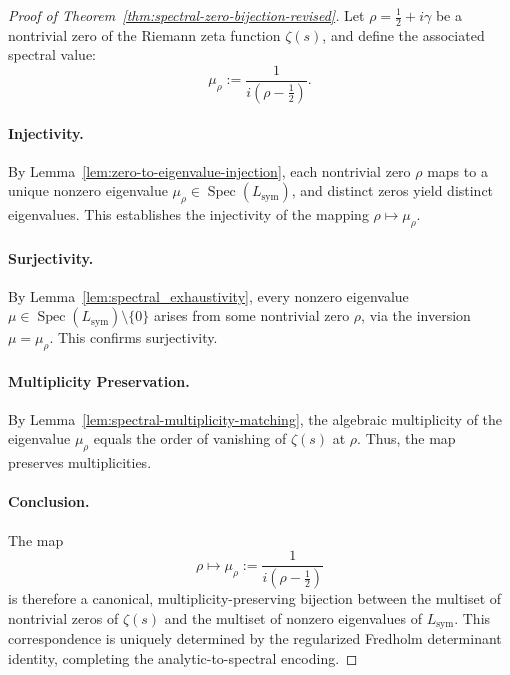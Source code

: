 \begin{proof}[Proof of Theorem~\ref{thm:spectral-zero-bijection-revised}]
Let \( \rho = \tfrac{1}{2} + i\gamma \) be a nontrivial zero of the Riemann zeta function \( \zeta(s) \), and define the associated spectral value:
\[
\mu_\rho := \frac{1}{i(\rho - \tfrac{1}{2})}.
\]

\paragraph{Injectivity.}
By Lemma~\ref{lem:zero-to-eigenvalue-injection}, each nontrivial zero \( \rho \) maps to a unique nonzero eigenvalue \( \mu_\rho \in \operatorname{Spec}(L_{\mathrm{sym}}) \), and distinct zeros yield distinct eigenvalues. This establishes the injectivity of the mapping \( \rho \mapsto \mu_\rho \).

\paragraph{Surjectivity.}
By Lemma~\ref{lem:spectral_exhaustivity}, every nonzero eigenvalue \( \mu \in \operatorname{Spec}(L_{\mathrm{sym}}) \setminus \{0\} \) arises from some nontrivial zero \( \rho \), via the inversion \( \mu = \mu_\rho \). This confirms surjectivity.

\paragraph{Multiplicity Preservation.}
By Lemma~\ref{lem:spectral-multiplicity-matching}, the algebraic multiplicity of the eigenvalue \( \mu_\rho \) equals the order of vanishing of \( \zeta(s) \) at \( \rho \). Thus, the map preserves multiplicities.

\paragraph{Conclusion.}
The map
\[
\rho \longmapsto \mu_\rho := \frac{1}{i(\rho - \tfrac{1}{2})}
\]
is therefore a canonical, multiplicity-preserving bijection between the multiset of nontrivial zeros of \( \zeta(s) \) and the multiset of nonzero eigenvalues of \( L_{\mathrm{sym}} \). This correspondence is uniquely determined by the regularized Fredholm determinant identity, completing the analytic-to-spectral encoding.
\end{proof}
% 